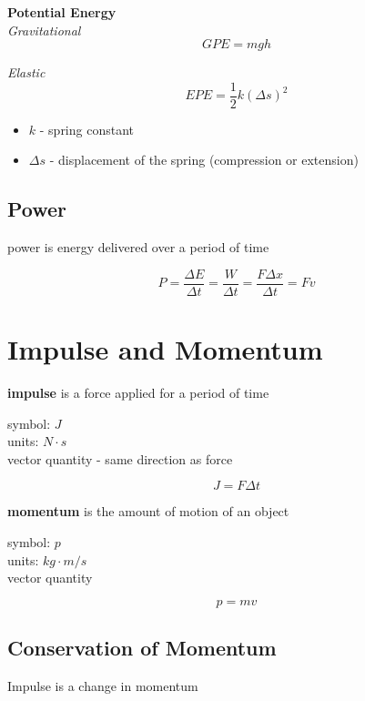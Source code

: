 \documentclass[titlepage]{article}
\begin{document}
\textbf{Potential Energy} \\
\emph{Gravitational}
\begin{equation*}
    GPE = mgh
\end{equation*}

\emph{Elastic}
\begin{equation*}
    EPE = \frac{1}{2}k (\Delta s)^2
\end{equation*}
\begin{itemize}
    \item $k$ - spring constant 
    \item $\Delta s$ - displacement of the spring (compression or extension)
\end{itemize}

\subsection{Power}
power is energy delivered over a period of time

\begin{equation*}
    P = \frac{\Delta E}{\Delta t} = \frac{W}{\Delta t} = \frac{F \Delta x}{\Delta t} = Fv
\end{equation*}

\section{Impulse and Momentum}
\textbf{impulse} is a force applied for a period of time

symbol: $J$ \\
units: $N \cdot s$\\
vector quantity - same direction as force

\begin{equation*}
    J = F \Delta t
\end{equation*}

\textbf{momentum} is the amount of motion of an object

symbol: $p$\\
units: $kg \cdot m/s$\\
vector quantity

\begin{equation*}
    p = mv
\end{equation*}

\subsection{Conservation of Momentum}
Impulse is a change in momentum
\end{document}
